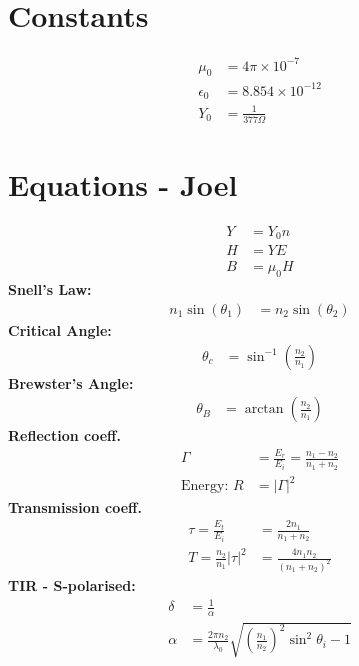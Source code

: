 \documentclass[landscape,a4paper,8pt]{article}
\begin{document}
\begin{multicols}{4}
	\section{Constants}
	\begin{align}
		\mu_0 &= 4\pi \times 10^{-7}\\
		\epsilon_0 &= 8.854 \times 10^{-12}\\
		Y_0 &= \frac{1}{377 \Omega}
	\end{align}
	
	\section{Equations - Joel}
	\begin{align}
		Y &= Y_0 n\\
		H &= YE\\
		B &= \mu_0 H
	\end{align}
	\textbf{Snell's Law: }
	\begin{align}
		n_1 \sin(\theta_1) &= n_2 \sin(\theta_2)
	\end{align}
	\textbf{Critical Angle:}
	\begin{align}
		\theta_c &= \sin^{-1}\left( \frac{n_2}{n_1} \right)
	\end{align}
	\textbf{Brewster's Angle:}
	\begin{align}
		\theta_B &=  \arctan \left( \frac{n_2}{n_1} \right)
	\end{align}
	\textbf{Reflection coeff.}
	\begin{align}
		\Gamma &= \frac{E_r}{E_i} = \frac{n_1 - n_2}{n_1 + n_2}\\
		\text{Energy: } R  &=  |\Gamma|^2
	\end{align}
	\textbf{Transmission coeff.}
	\begin{align}
		\tau = \frac{E_t}{E_i} &= \frac{2n_1}{n_1 + n_2}\\
		T = \frac{n_2}{n_1} |\tau|^2 &= \frac{4 n_1 n_2}{(n_1 + n_2)^2}
	\end{align}
	\textbf{TIR - S-polarised:}
	\begin{align}
		\delta &= \frac{1}{\alpha}\\
		\alpha &= \frac{2\pi n_2}{\lambda_0} \sqrt{\left( \frac{n_1}{n_2} \right)^2 \sin^2\theta_i - 1}\\

\end{align}
\end{multicols}
\end{document}
